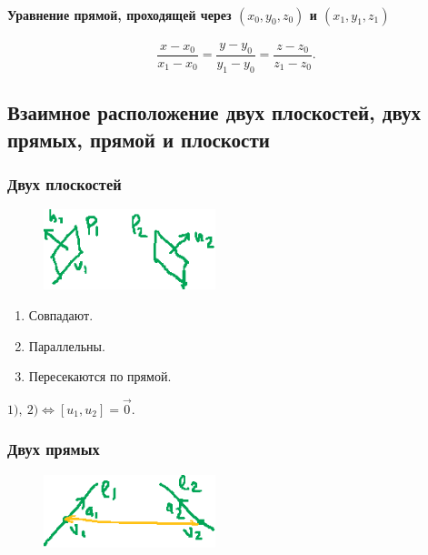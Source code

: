 \paragraph{Уравнение прямой, проходящей через $(x_0, y_0, z_0)$ и $(x_1, y_1, z_1)$}

\begin{equation*}
    \frac{x - x_0}{x_1 - x_0} = \frac{y - y_0}{y_1 - y_0} = \frac{z - z_0}{z_1 - z_0}
.\end{equation*}


\subsection{Взаимное расположение двух плоскостей, двух прямых, прямой и плоскости}

\subsubsection{Двух плоскостей}

\begin{figure}
    \vspace{-70pt}
    \includegraphics[width=5cm]{img/lecture26_drawing_4}
\end{figure}

\begin{enumerate}[nosep]
    \item \label{lec26:l1} Совпадают.
    \item \label{lec26:l2} Параллельны.
    \item Пересекаются по прямой.
\end{enumerate}

\medskip
$\hyperref[lec26:l1]{1)}, \ \hyperref[lec26:l2]{2)} \iff [u_1, u_2] = \overrightarrow{0}$.


\subsubsection{Двух прямых}

\begin{figure}
    \vspace{-70pt}
    \includegraphics[width=5cm]{img/lecture26_drawing_5}
\end{figure}

